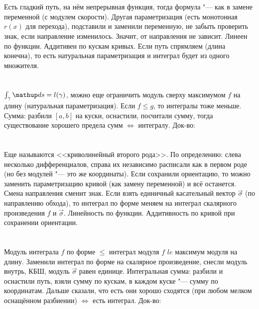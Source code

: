 \section{} %
Есть гладкий путь, на нём непрерывная функция, тогда формула "--- как в замене переменной (с модулем скорости).
Другая параметризация (есть монотонная $r(x)$ для перехода), подставили и заменили переменную, не забыть проверить знак, если направление изменилось.
Значит, от направления не зависит.
Линеен по функции.
Аддитивен по кускам кривых.
Если путь спрямляем (длина конечна), то есть натуральная параметризация и интеграл будет из одного множителя.

\section{} %
$\int_{\gamma} \d s = l(\gamma)$, можно еще ограничить модуль сверху максимумом $f$ на длину (натуральная параметризация).
Если $f \le g$, то интегралы тоже меньше.
Сумма: разбили $[a,b]$ на куски, оснастили, посчитали сумму, тогда существование хорошего предела сумм $\iff$ интегралу.
Док-во: \TODO %

\section{} %
Еще называются <<криволинейный второго рода>>.
По определению: слева несколько дифференциалов, справа их независимо расписали как в первом роде (но без модулей "--- это же координаты).
Если сохранили ориентацию, то можно заменить параметризацию кривой (как замену переменной) и всё останется.
Смена направления сменит знак.
Если взять единичный касательный вектор $\vec \sigma$ (по направлению обхода), то интеграл по форме меняем на интеграл скалярного произведения $f$ и $\vec\sigma$.
Линейность по функции.
Аддитивность по кривой при сохранении ориентации.

\section{} %
Модуль интеграла $f$ по форме $\le$ интеграл модуля $f$ $le$ максимум модуля на длину.
Заменили интеграл по форме на скалярное произведение, снесли модуль внутрь, КБШ, модуль $\vec \sigma$ равен единице.
Интегральная сумма: разбили и оснастили путь, взяли сумму по кускам, в каждом куске "--- сумму по координатам.
Дальше сказали, что есть они хорошо сходятся (при любом мелком оснащённом разбиении) $\iff$ есть интеграл.
Док-во: \TODO %

